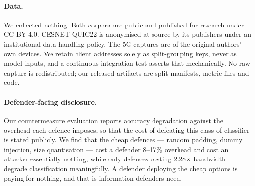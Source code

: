 \paragraph{Data.} We collected nothing. Both corpora are public and published
for research under CC BY 4.0. CESNET-QUIC22 is anonymised at source by its
publishers under an institutional data-handling policy. The 5G captures are of
the original authors' own devices. We retain client addresses solely as
split-grouping keys, never as model inputs, and a continuous-integration test
asserts that mechanically. No raw capture is redistributed; our released
artifacts are split manifests, metric files and code.

\paragraph{Defender-facing disclosure.} Our countermeasure evaluation reports
accuracy degradation against the overhead each defence imposes, so that the
cost of defeating this class of classifier is stated publicly. We find that the
cheap defences --- random padding, dummy injection, size quantisation --- cost
a defender 8--17\% overhead and cost an attacker essentially nothing, while
only defences costing 2.28$\times$ bandwidth degrade classification
meaningfully. A defender deploying the cheap options is paying for nothing, and
that is information defenders need.
